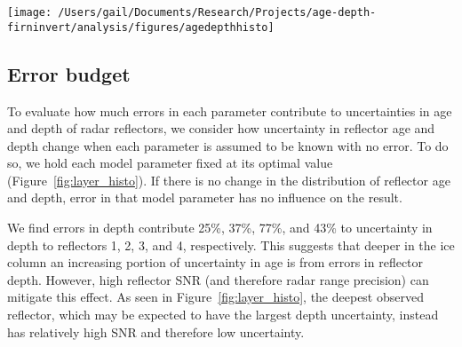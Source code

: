 



\begin{figure*}[h]
\centering
\texttt{[image: /Users/gail/Documents/Research/Projects/age-depth-firninvert/analysis/figures/agedepthhisto]}
\caption{Posterior probability distributions of depth (top) and age (bottom) of 4 radar reflectors at the Byrd ice core. The width of the age and depth histograms for the Byrd ice core chronology represent uncertainty estimated by the methods used here.}
\label{fig:layer_histo}
\end{figure*}

\begin{figure*}[h]
\centering
{}
\caption{Modeled age-depth relationship with uncertainty compared to measured volcanic chronology from \citet[]{hammer1997} (open circles). The WAIS Divide ice core chronology \citep{buizert2015} as a black line. Blue triangles show the age-depth of 4 radar reflectors at each of the Byrd and WAIS Divide ice cores; these reflectors are assumed isochronous and so expected to be the same age at either ice core.}
\label{fig:spaghetti}
\end{figure*}

\subsection{Error budget}
To evaluate how much errors in each parameter contribute to uncertainties in age and depth of radar reflectors, we consider how uncertainty in reflector age and depth change when each parameter is assumed to be known with no error. To do so, we hold each model parameter fixed at its optimal value (Figure~\ref{fig:layer_histo}). If there is no change in the distribution of reflector age and depth, error in that model parameter has no influence on the result.

We find errors in depth contribute 25\%, 37\%, 77\%, and 43\% to uncertainty in depth to reflectors 1, 2, 3, and 4, respectively. This suggests that deeper in the ice column an increasing portion of uncertainty in age is from errors in reflector depth. However, high reflector SNR (and therefore radar range precision) can mitigate this effect. As seen in Figure~\ref{fig:layer_histo}, the deepest observed reflector, which may be expected to have the largest depth uncertainty, instead has relatively high SNR and therefore low uncertainty.

